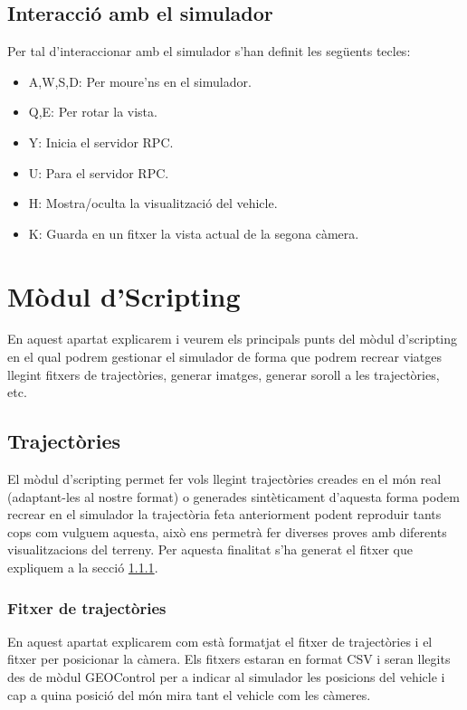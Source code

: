 \documentclass[10pt,a4paper,twocolumn,twoside]{article}
\begin{document}
\subsection{Interacció amb el simulador}
Per tal d'interaccionar amb el simulador s'han definit les següents tecles:

\begin{itemize}
\item A,W,S,D: Per moure'ns en el simulador.
\item Q,E: Per rotar la vista.
\item Y: Inicia el servidor RPC.
\item U: Para el servidor RPC.
\item H: Mostra/oculta la visualització del vehicle.
\item K: Guarda en un fitxer la vista actual de la segona càmera.
\end{itemize}

\section{Mòdul d'Scripting}
\label{modulescript}
En aquest apartat explicarem i veurem els principals punts del mòdul d'scripting en el qual podrem gestionar el simulador de forma que podrem recrear viatges llegint fitxers de trajectòries, generar imatges, generar soroll a les trajectòries, etc.

\subsection{Trajectòries}
El mòdul d'scripting permet fer vols llegint trajectòries creades en el món real (adaptant-les al nostre format) o generades sintèticament d'aquesta forma podem recrear en el simulador la trajectòria feta anteriorment podent reproduir tants cops com vulguem aquesta, això ens permetrà fer diverses proves amb diferents visualitzacions del terreny. Per aquesta finalitat s'ha generat el fitxer que expliquem a la secció \ref{file-trajectories}.

\subsubsection{Fitxer de trajectòries}
\label{file-trajectories}
En aquest apartat explicarem com està formatjat el fitxer de trajectòries i el fitxer per posicionar la càmera. Els fitxers estaran en format CSV i seran llegits des de mòdul GEOControl per a indicar al simulador les posicions del vehicle i cap a quina posició del món mira tant el vehicle com les càmeres.
\end{document}
